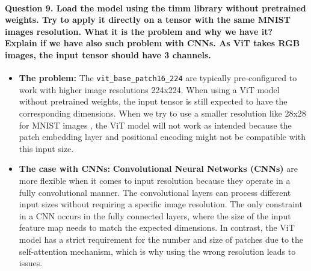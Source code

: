 \documentclass{article}
\begin{document}
\paragraph{Question 9. Load the model using the timm library without pretrained weights. Try to apply it directly on a tensor with the same MNIST images resolution. What it is the problem and why we have it? Explain if we have also such problem with CNNs. As ViT takes RGB images, the input tensor should have 3 channels. }
\begin{itemize}
    \item \textbf{The problem:} The  \texttt{vit\_base\_patch16\_224} are typically pre-configured to work with higher image resolutions 224x224. When using a ViT model without pretrained weights, the input tensor is still expected to have the corresponding dimensions. When we try to use a smaller resolution like 28x28 for MNIST images , the ViT model will not work as intended because the patch embedding layer and positional encoding might not be compatible with this input size. 
    \item \textbf{The case with CNNs:}  \textbf{Convolutional Neural Networks (CNNs)} are more flexible when it comes to input resolution because they operate in a fully convolutional manner. The convolutional layers can process different input sizes without requiring a specific image resolution. The only constraint in a CNN occurs in the fully connected layers, where the size of the input feature map needs to match the expected dimensions. In contrast, the ViT model has a strict requirement for the number and size of patches due to the self-attention mechanism, which is why using the wrong resolution leads to issues.
\end{itemize}
\end{document}

